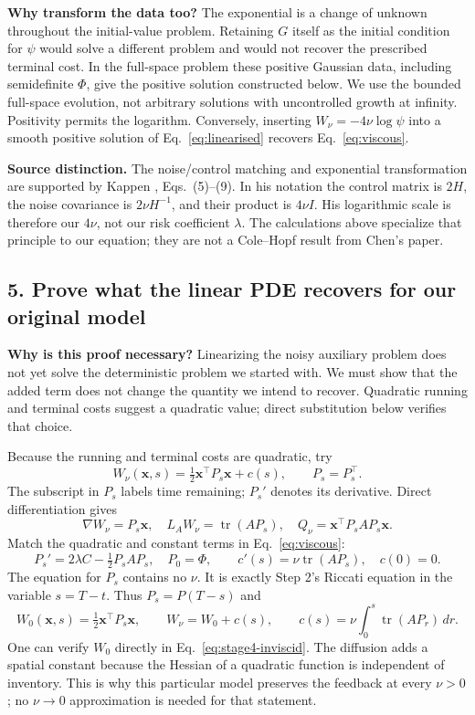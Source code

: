 \textbf{Why transform the data too?} The exponential is a change of
unknown throughout the initial-value problem. Retaining $G$ itself as
the initial condition for $\psi$ would solve a different problem and
would not recover the prescribed terminal cost.
In the full-space problem these positive Gaussian data, including
semidefinite $\Phi$, give the positive solution constructed below. We use
the bounded full-space evolution, not arbitrary solutions with uncontrolled
growth at infinity. Positivity permits the logarithm. Conversely, inserting
$W_\nu=-4\nu\log\psi$ into a smooth positive solution of
Eq.~\eqref{eq:linearised} recovers Eq.~\eqref{eq:viscous}.

\textbf{Source distinction.} The noise/control matching and exponential
transformation are supported by Kappen \cite{kappen2005}, Eqs.~(5)--(9).
In his notation the control matrix is $2H$, the noise covariance is
$2\nu H^{-1}$, and their product is $4\nu I$. His logarithmic scale is
therefore our $4\nu$, not our risk coefficient $\lambda$.
The calculations above specialize that principle to our equation;
they are not a Cole--Hopf result from Chen's paper.

\subsection*{5. Prove what the linear PDE recovers for our original model}

\textbf{Why is this proof necessary?} Linearizing the noisy auxiliary
problem does not yet solve the deterministic problem we started with.
We must show that the added term does not change the quantity we intend
to recover. Quadratic running and terminal costs suggest a quadratic
value; direct substitution below verifies that choice.

Because the running and terminal costs are quadratic, try
\[
 W_\nu(\mathbf x,s)=\tfrac12\mathbf x^\top P_s\mathbf x+c(s),
 \qquad P_s=P_s^\top.
\]
The subscript in $P_s$ labels time remaining; $P_s'$ denotes its
derivative. Direct differentiation gives
\[
 \nabla W_\nu=P_s\mathbf x,\quad
 L_AW_\nu=\operatorname{tr}(AP_s),\quad
 Q_\nu=\mathbf x^\top P_sAP_s\mathbf x.
\]
Match the quadratic and constant terms in Eq.~\eqref{eq:viscous}:
\begin{equation}
 P_s'=2\lambda C-\tfrac12P_sAP_s,\quad P_0=\Phi,
 \qquad c'(s)=\nu\operatorname{tr}(AP_s),\quad c(0)=0.
 \label{eq:stage4-quadratic}
\end{equation}
The equation for $P_s$ contains no $\nu$. It is exactly Step 2's Riccati
equation in the variable $s=T-t$. Thus $P_s=P(T-s)$ and
\begin{equation}
 W_0(\mathbf x,s)=\tfrac12\mathbf x^\top P_s\mathbf x,\qquad
 W_\nu=W_0+c(s),\qquad
 c(s)=\nu\int_0^s\operatorname{tr}(AP_r)\,dr.
 \label{eq:stage4-correction}
\end{equation}
One can verify $W_0$ directly in Eq.~\eqref{eq:stage4-inviscid}.
The diffusion adds a spatial constant because the Hessian of a quadratic
function is independent of inventory. This is why this particular model
preserves the feedback at every $\nu>0$; no $\nu\to0$ approximation is
needed for that statement.

